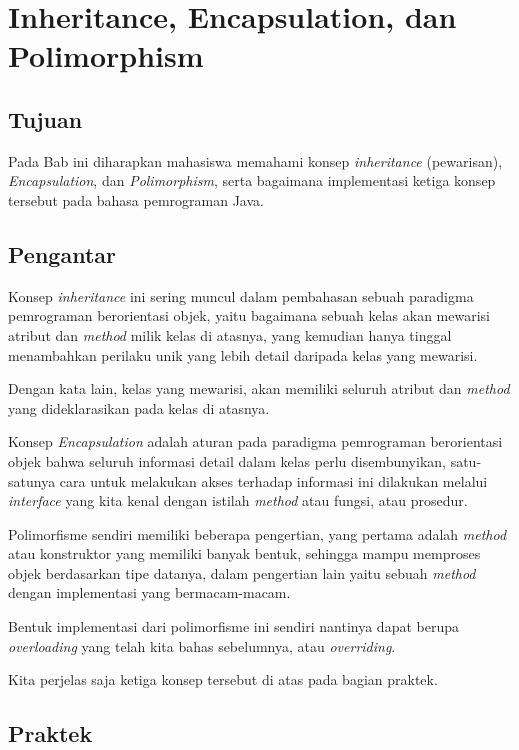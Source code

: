 \chapter{Inheritance, Encapsulation, dan Polimorphism}

\section{Tujuan}

Pada Bab ini diharapkan mahasiswa memahami konsep \textit{inheritance} (pewarisan), \textit{Encapsulation}, dan \textit{Polimorphism}, serta bagaimana implementasi ketiga konsep tersebut pada bahasa pemrograman Java.

\section{Pengantar}

Konsep \textit{inheritance} ini sering muncul dalam pembahasan sebuah paradigma pemrograman berorientasi objek, yaitu bagaimana sebuah kelas akan mewarisi atribut dan \textit{method} milik kelas di atasnya, yang kemudian hanya tinggal menambahkan perilaku unik yang lebih detail daripada kelas yang mewarisi.

Dengan kata lain, kelas yang mewarisi, akan memiliki seluruh atribut dan \textit{method} yang dideklarasikan pada kelas di atasnya.

Konsep \textit{Encapsulation} adalah aturan pada paradigma pemrograman berorientasi objek bahwa seluruh informasi detail dalam kelas perlu disembunyikan, satu-satunya cara untuk melakukan akses terhadap informasi ini dilakukan melalui \textit{interface} yang kita kenal dengan istilah \textit{method} atau fungsi, atau prosedur.

Polimorfisme sendiri memiliki beberapa pengertian, yang pertama adalah \textit{method} atau konstruktor yang memiliki banyak bentuk, sehingga mampu memproses objek berdasarkan tipe datanya, dalam pengertian lain yaitu sebuah \textit{method} dengan implementasi yang bermacam-macam. 

Bentuk implementasi dari polimorfisme ini sendiri nantinya dapat berupa \textit{overloading} yang telah kita bahas sebelumnya, atau \textit{overriding}.

Kita perjelas saja ketiga konsep tersebut di atas pada bagian praktek.

\section{Praktek}

